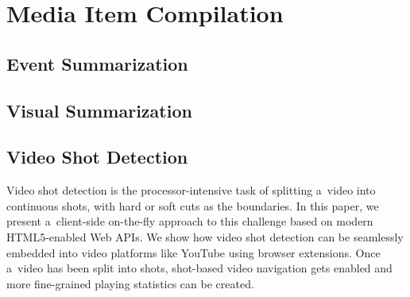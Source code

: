 

\chapter{Media Item Compilation}

\ifpdf
    \graphicspath{{8_media_item_compilation/figures/PNG/}{8_media_item_compilation/figures/PDF/}{8_media_item_compilation/figures/}}
\else
    \graphicspath{{8_media_item_compilation/figures/EPS/}{8_media_item_compilation/figures/}}
\fi


\section{Event Summarization}

\section{Visual Summarization}

\section{Video Shot Detection}
Video shot detection is the processor-intensive task of splitting a~video into continuous shots, with hard or soft cuts as the boundaries. In this paper, we present a~client-side on-the-fly approach to this challenge based on modern HTML5-enabled Web APIs. We show how video shot detection can be seamlessly embedded into video platforms like YouTube using browser extensions. Once a~video has been split into shots, shot-based video navigation gets enabled and more fine-grained playing statistics can be created.

